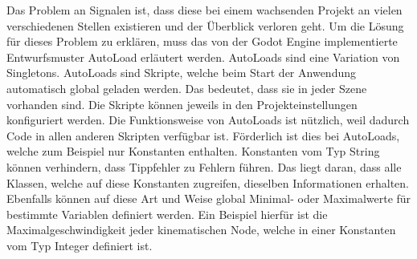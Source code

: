 
Das Problem an Signalen ist, dass diese bei einem wachsenden Projekt an vielen verschiedenen Stellen existieren und der Überblick verloren geht.
Um die Lösung für dieses Problem zu erklären, muss das von der Godot Engine implementierte Entwurfsmuster AutoLoad erläutert werden\cite{godot-autoload}.
AutoLoads sind eine Variation von Singletons\cite[S. 127]{design-patterns-gof}.
AutoLoads sind Skripte, welche beim Start der Anwendung automatisch global geladen werden.
Das bedeutet, dass sie in jeder Szene vorhanden sind.
Die Skripte können jeweils in den Projekteinstellungen konfiguriert werden.
Die Funktionsweise von AutoLoads ist nützlich, weil dadurch Code in allen anderen Skripten verfügbar ist.
Förderlich ist dies bei AutoLoads, welche zum Beispiel nur Konstanten enthalten.
Konstanten vom Typ String können verhindern, dass Tippfehler zu Fehlern führen.
Das liegt daran, dass alle Klassen, welche auf diese Konstanten zugreifen, dieselben Informationen erhalten.
Ebenfalls können auf diese Art und Weise global Minimal- oder Maximalwerte für bestimmte Variablen definiert werden.
Ein Beispiel hierfür ist die Maximalgeschwindigkeit jeder kinematischen Node, welche in einer Konstanten vom Typ Integer definiert ist.\\


